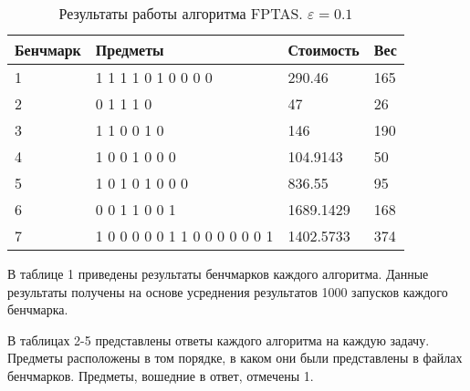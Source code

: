\documentclass{article}
\begin{document}
\begin{table}[!h]
    \begin{center}
        \begin{tabular}{ | m{4.1em} | m{15em} | m{4.5em} | m{4.5em} |}
            \hline
            Бенчмарк & Предметы                      & Стоимость & Вес \\
            \hline
            1        & 1 1 1 1 0 1 0 0 0 0           & 290.46    & 165 \\
            \hline
            2        & 0 1 1 1 0                     & 47        & 26  \\
            \hline
            3        & 1 1 0 0 1 0                   & 146       & 190 \\
            \hline
            4        & 1 0 0 1 0 0 0                 & 104.9143  & 50  \\
            \hline
            5        & 1 0 1 0 1 0 0 0               & 836.55    & 95  \\
            \hline
            6        & 0 0 1 1 0 0 1                 & 1689.1429 & 168 \\
            \hline
            7        & 1 0 0 0 0 0 1 1 0 0 0 0 0 0 1 & 1402.5733 & 374 \\
            \hline
        \end{tabular}
        \caption{Результаты работы алгоритма FPTAS. $\varepsilon = 0.1$}
    \end{center}
\end{table}


В таблице 1 приведены результаты бенчмарков каждого алгоритма.
Данные результаты получены на основе усреднения результатов 1000 запусков каждого бенчмарка.

В таблицах 2-5 представлены ответы каждого алгоритма на каждую задачу.
Предметы расположены в том порядке, в каком они были представлены в файлах бенчмарков.
Предметы, вошедние в ответ, отмечены 1.
\end{document}
